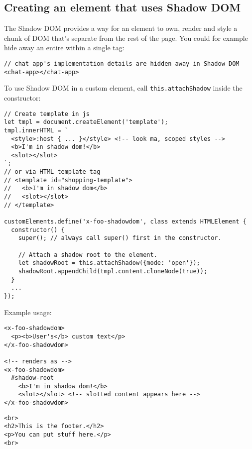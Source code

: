 \documentclass[11pt]{article}
\begin{document}
\subsection{Creating an element that uses Shadow DOM}
\label{sec:orgd1cb272}
The Shadow DOM provides a way for an element to own, render and style a chunk of DOM that's separate from the rest of the page. You could for example hide away an entire within a single tag:
\lstset{breaklines=true,language=js,label= ,caption= ,captionpos=b,numbers=none}
\begin{lstlisting}
// chat app's implementation details are hidden away in Shadow DOM
<chat-app></chat-app>
\end{lstlisting}
To use Shadow DOM in a custom element, call \texttt{this.attachShadow} inside the constructor:
\lstset{breaklines=true,language=js,label= ,caption= ,captionpos=b,numbers=none}
\begin{lstlisting}
// Create template in js
let tmpl = document.createElement('template'); 
tmpl.innerHTML = `
  <style>:host { ... }</style> <!-- look ma, scoped styles -->
  <b>I'm in shadow dom!</b>
  <slot></slot>
`;
// or via HTML template tag
// <template id="shopping-template">
//   <b>I'm in shadow dom</b>
//   <slot></slot>
// </template>

customElements.define('x-foo-shadowdom', class extends HTMLElement {
  constructor() {
    super(); // always call super() first in the constructor.

    // Attach a shadow root to the element.
    let shadowRoot = this.attachShadow({mode: 'open'});
    shadowRoot.appendChild(tmpl.content.cloneNode(true));
  }
  ...
});
\end{lstlisting}
Example usage:
\lstset{breaklines=true,language=js,label= ,caption= ,captionpos=b,numbers=none}
\begin{lstlisting}
<x-foo-shadowdom>
  <p><b>User's</b> custom text</p>
</x-foo-shadowdom>

<!-- renders as -->
<x-foo-shadowdom>
  #shadow-root
    <b>I'm in shadow dom!</b>
    <slot></slot> <!-- slotted content appears here -->
</x-foo-shadowdom>
\end{lstlisting}
\lstset{breaklines=true,language=HTML,label= ,caption= ,captionpos=b,numbers=none}
\begin{lstlisting}
<br>
<h2>This is the footer.</h2>
<p>You can put stuff here.</p>
<br>
\end{lstlisting}
\end{document}
